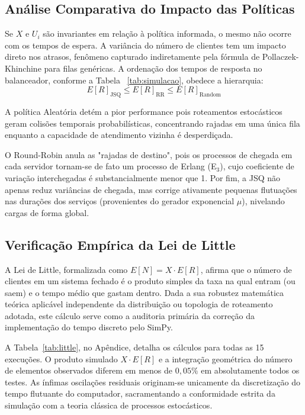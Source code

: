 \documentclass[conference]{IEEEtran}
\begin{document}
\subsection{Análise Comparativa do Impacto das Políticas}

Se $X$ e $U_i$ são invariantes em relação à política informada, o mesmo não ocorre com os tempos de espera. A variância do número de clientes tem um impacto direto nos atrasos, fenômeno capturado indiretamente pela fórmula de Pollaczek-Khinchine para filas genéricas. A ordenação dos tempos de resposta no balanceador, conforme a Tabela ~\ref{tab:simulacao}, obedece a hierarquia:
\begin{equation}
E[R]_{\text{JSQ}} \le E[R]_{\text{RR}} \le E[R]_{\text{Random}}
\end{equation}

A política Aleatória detém a pior performance pois roteamentos estocásticos geram colisões temporais probabilísticas, concentrando rajadas em uma única fila enquanto a capacidade de atendimento vizinha é desperdiçada. 

O Round-Robin anula as "rajadas de destino", pois os processos de chegada em cada servidor tornam-se de fato um processo de Erlang (E$_3$), cujo coeficiente de variação interchegadas é substancialmente menor que 1. Por fim, a JSQ não apenas reduz variâncias de chegada, mas corrige ativamente pequenas flutuações nas durações dos serviços (provenientes do gerador exponencial $\mu$), nivelando cargas de forma global.

\subsection{Verificação Empírica da Lei de Little}

A Lei de Little, formalizada como $E[N] = X \cdot E[R]$, afirma que o número de clientes em um sistema fechado é o produto simples da taxa na qual entram (ou saem) e o tempo médio que gastam dentro. Dada a sua robustez matemática teórica aplicável independente da distribuição ou topologia de roteamento adotada, este cálculo serve como a auditoria primária da correção da implementação do tempo discreto pelo SimPy.

A Tabela~\ref{tab:little}, no Apêndice, detalha os cálculos para todas as 15 execuções. O produto simulado $X \cdot E[R]$ e a integração geométrica do número de elementos observados diferem em menos de $0{,}05\%$ em absolutamente todos os testes. As ínfimas oscilações residuais originam-se unicamente da discretização do tempo flutuante do computador, sacramentando a conformidade estrita da simulação com a teoria clássica de processos estocásticos.
\end{document}
